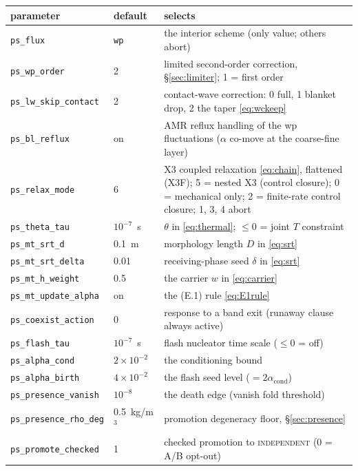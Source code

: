 \documentclass[11pt,a4paper]{article}
\newcommand{\code}[1]{\texttt{\small #1}}
\begin{document}
\begin{center}
\begin{tabular}{@{}ll>{\raggedright\arraybackslash}p{}@{}}
\toprule
parameter & default & selects \\
\midrule
\code{ps\_flux}              & \code{wp} & the interior scheme (only value; others abort) \\
\code{ps\_wp\_order}         & 2 & limited second-order correction, \S\ref{sec:limiter}; 1 = first order \\
\code{ps\_lw\_skip\_contact} & 2 & contact-wave correction: 0 full, 1 blanket drop, 2 the taper \eqref{eq:wckeep} \\
\code{ps\_bl\_reflux}        & on & AMR reflux handling of the wp fluctuations ($\alpha$ co-move at the coarse-fine layer) \\
\code{ps\_relax\_mode}       & 6 & X3 coupled relaxation \eqref{eq:chain}, flattened (X3F); 5 = nested X3 (control closure); 0 = mechanical only; 2 = finite-rate control closure; 1, 3, 4 abort \\
\code{ps\_theta\_tau}        & $10^{-7}$~s & $\theta$ in \eqref{eq:thermal}; $\le0$ = joint $T$ constraint \\
\code{ps\_mt\_srt\_d}        & 0.1~m & morphology length $D$ in \eqref{eq:srt} \\
\code{ps\_mt\_srt\_delta}    & 0.01 & receiving-phase seed $\delta$ in \eqref{eq:srt} \\
\code{ps\_mt\_h\_weight}     & 0.5 & the carrier $w$ in \eqref{eq:carrier} \\
\code{ps\_mt\_update\_alpha} & on  & the (E.1) rule \eqref{eq:E1rule} \\
\code{ps\_coexist\_action}   & 0 & response to a band exit (runaway clause always active) \\
\code{ps\_flash\_tau}        & $10^{-7}$~s & flash nucleator time scale ($\le0$ = off) \\
\code{ps\_alpha\_cond}       & $2\times10^{-2}$ & the conditioning bound \\
\code{ps\_alpha\_birth}      & $4\times10^{-2}$ & the flash seed level ($=2\alpha_{\mathrm{cond}}$) \\
\code{ps\_presence\_vanish}  & $10^{-8}$ & the death edge (vanish fold threshold) \\
\code{ps\_presence\_rho\_deg} & 0.5~kg/m$^3$ & promotion degeneracy floor, \S\ref{sec:presence} \\
\code{ps\_promote\_checked}  & 1 & checked promotion to \textsc{independent} (0 = A/B opt-out) \\

\end{tabular}
\end{center}
\end{document}
